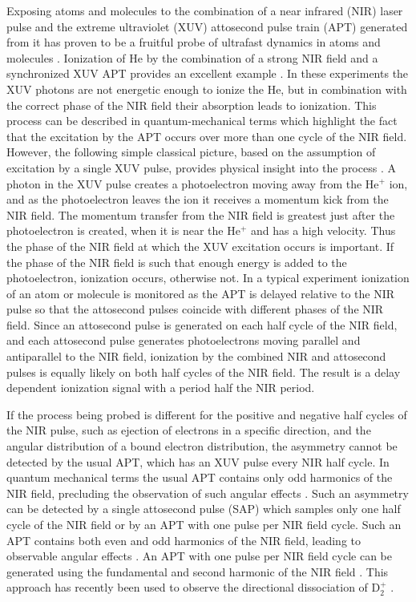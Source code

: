 \documentclass[aps,pra,reprint,groupedaddress]{revtex4-1}
\begin{document}
Exposing atoms and molecules to the combination of a near infrared (NIR) laser pulse and the extreme ultraviolet (XUV) attosecond pulse train (APT) generated from it has proven to be a fruitful probe of ultrafast dynamics in atoms and molecules \cite{Krausz}. Ionization of He by the combination of a strong NIR field and a synchronized XUV APT provides an excellent example \cite{Johnsson, Ranitovic, Tong}.  In these experiments the XUV photons are not energetic enough to ionize the He, but in combination with the correct phase of the NIR field their absorption leads to ionization. This process can be described in quantum-mechanical terms which highlight the fact that the excitation by the APT occurs over more than one cycle of the NIR field. However, the following simple classical picture, based on the assumption of excitation by a single XUV pulse, provides physical insight into the process \cite{Johnsson, Ranitovic, Tong, Zhong}. A photon in the XUV pulse creates a photoelectron moving away from the He$^+$ ion, and as the photoelectron leaves the ion it receives a momentum kick from the NIR field. The momentum transfer from the NIR field is greatest just after the photoelectron is created, when it is near the He$^+$ and has a high velocity. Thus the phase of the NIR field at which the XUV excitation occurs is important. If the phase of the NIR field is such that enough energy is added to the photoelectron, ionization occurs, otherwise not. In a typical experiment ionization of an atom or molecule is monitored as the APT is delayed relative to the NIR pulse so that the attosecond pulses coincide with different phases of the NIR field. Since an attosecond  pulse is generated on each half cycle of the NIR field, and each attosecond pulse generates photoelectrons moving parallel and antiparallel to the NIR field, ionization by the combined NIR and attosecond pulses is equally likely on both half cycles of the NIR field. The result is a delay dependent ionization signal with a period half the NIR period.

If the process being probed is different for the positive and negative half cycles of the NIR pulse, such as ejection of electrons in a specific direction, and the angular distribution of a bound electron distribution, the asymmetry cannot be detected by the usual APT, which has an XUV pulse every NIR half cycle. In quantum mechanical terms the usual APT contains only odd harmonics of the NIR field, precluding the observation of such angular effects \cite{Zhong}. Such an asymmetry can be detected by a single attosecond pulse (SAP) which samples only one half cycle of the NIR field or by an APT with one pulse per NIR field cycle. Such an APT contains both even and odd harmonics of the NIR field, leading to observable angular effects \cite{Zhong}. An APT with one pulse per NIR field cycle can be generated using the fundamental and second harmonic of the NIR field \cite{Mauritsson}. This approach has recently been used to observe the directional dissociation of D$_2^+$ \cite{Singh}.
\end{document}
